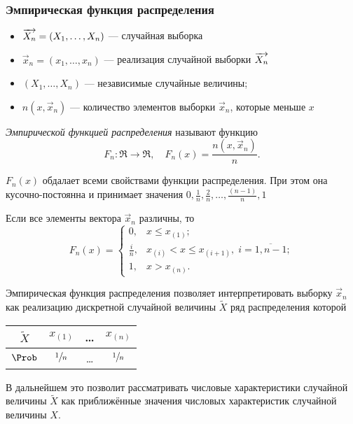 \subsubsection{Эмпирическая функция распределения}

\begin{itemize}
	\item $\overrightarrow{X_n} = (X_1, \ldots, X_n)$ --- случайная выборка
	\item $\vec{x}_n = (x_1, \dots, x_n)$ --- реализация случайной выборки $\overrightarrow{X_n}$ 
	\item $(X_1, \ldots, X_n)$ --- независимые случайные величины;
	\item $n(x, \vec{x}_n)$ --- количество элементов выборки $\vec{x}_n$, которые меньше $x$
\end{itemize}

\begin{defn}
	\emph{Эмпирической функцией распределения} называют функцию
	\[
		F_n\colon \Re \to \Re, \quad F_n(x) = \frac{n(x, \vec{x}_n)}{n}.
	\]
\end{defn}
\begin{rem}
	$F_n(x)$ обдалает всеми свойствами функции распределения. При этом она кусочно-постоянна и принимает значения $0, \frac{1}{n}, \frac{2}{n}, \ldots, \frac{(n-1)}{n}, 1$
\end{rem}
\begin{rem}
	Если все элементы вектора $\vec{x}_n$ различны, то
	\[
		F_n(x) = 
		\begin{cases}
			0, & x \leq x_{(1)}; \\
			\frac{i}{n}, & x_{(i)} < x \leq x_{(i+1)},\; i = \overline{1, n-1}; \\
			1, & x > x_{(n)}.
		\end{cases}
	\]
\end{rem}
\begin{rem}
	Эмпирическая функция распределения позволяет интерпретировать выборку $\vec{x}_n$ как реализацию дискретной случайной величины $\widetilde{X}$ ряд распределения которой
	\begin{center}
		\renewcommand{\arraystretch}{1.5}
		\begin{tabular}{| c || c | c | c |}
		\hline
		$\widetilde{X}$ & $x_{(1)}$ & \ldots & $x_{(n)}$ \\
		\hline
		$\Prob$ & $\sfrac{1}{n}$ & \ldots & $\sfrac{1}{n}$ \\
		\hline
		\end{tabular}
	\end{center}
	В дальнейшем это позволит рассматривать числовые характеристики случайной величины $\widetilde{X}$ как приближённые значения числовых характеристик случайной величины $X$.
\end{rem}


